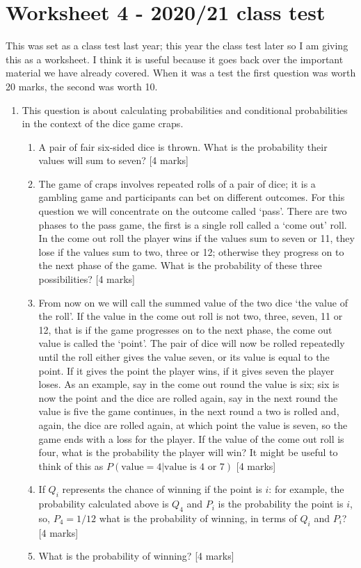 \documentclass[11pt,a4paper]{scrartcl}
\begin{document}
\section*{Worksheet 4 - 2020/21 class test}

This was set as a class test last year; this year the class test later
so I am giving this as a worksheet. I think it is useful because
it goes back over the important material we have already covered. When
it was a test the first question was worth 20 marks, the second was
worth 10.

\begin{enumerate}

\item This question is about calculating probabilities and conditional probabilities in the context of the dice game craps.

\begin{enumerate}
  \item A pair of fair six-sided dice is thrown. What is the probability their values will sum to seven? [4 marks]
  \item The game of craps involves repeated rolls of a pair of dice; it is a gambling game and participants can bet on different outcomes. For this question we will concentrate on the outcome called \lq{}pass\rq{}. There are two phases to the pass game, the first is a single roll called a \lq{}come out\rq{} roll. In the come out roll the player wins if the values sum to seven or 11, they lose if the values sum to two, three or 12; otherwise they progress on to the next phase of the game. What is the probability of these three possibilities?  [4 marks]
  \item From now on we will call the summed value of the two dice \lq{}the value of the roll\rq{}. If the value in the come out roll is not two, three, seven, 11 or 12, that is if the game progresses on to the next phase, the come out value is called the \lq{}point\rq{}. The pair of dice will now be  rolled repeatedly until the roll either gives the value seven, or its value is equal to the point. If it gives the point the player wins, if it gives seven the player loses. As an example, say in the come out round the value is six; six is now the point and the dice are rolled again, say in the next round the value is five the game continues, in the next round a two is rolled and, again, the dice are rolled again, at which point the value is seven, so the game ends with a loss for the player. If the value of the come out roll is four, what is the probability the player will win? It might be useful to think of this as $P(\mbox{value}=4|\mbox{value is 4 or 7})$ [4 marks]
  \item If  $Q_i$ represents the chance of winning if the point is $i$: for example, the probability calculated above is $Q_4$ and $P_i$ is the probability the point is $i$, so, $P_4=1/12$
what is the probability of winning, in terms of $Q_i$ and $P_i$? [4 marks]
\item What is the probability of winning? [4 marks]


\end{enumerate}
\end{enumerate}
\end{document}
